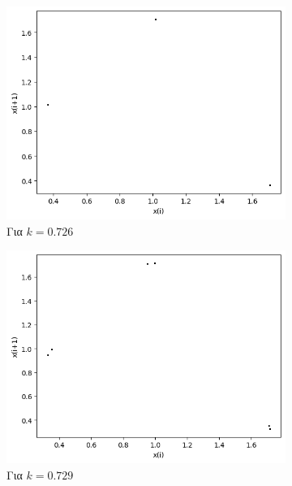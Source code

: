 \begin{figure}[ht]
	\centering
	\begin{subfigure}[b]{0.4\textwidth}
		\centering
		\includegraphics[width=\textwidth]{LateX images/graphs q12/g9}
		\caption{Για $k=0.726$}
		\label{f:k65}
	\end{subfigure}
	\hfill
	\begin{subfigure}[b]{0.4\textwidth}
		\centering
		\includegraphics[width=\textwidth]{LateX images/graphs q12/g10}
		\caption{Για $k=0.729$}
		\label{f:k66}
	\end{subfigure}
	\hfill
	\begin{subfigure}[b]{0.4\textwidth}
		\centering

\end{subfigure}
\end{figure}
